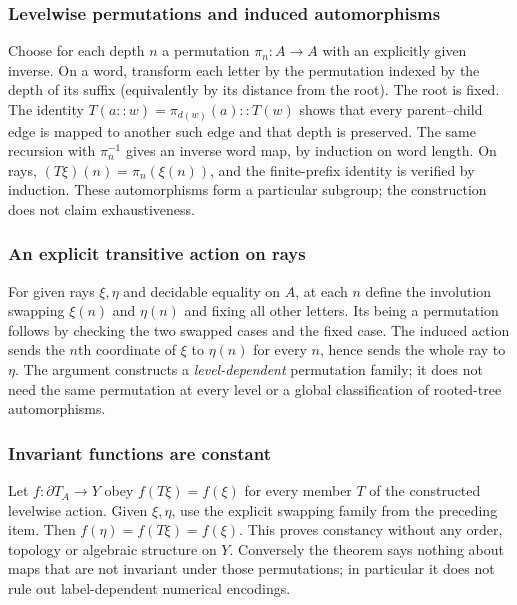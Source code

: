 \documentclass[11pt,reqno]{amsart}
\theoremstyle{definition}\newtheorem{definition}[theorem]{Definition}
\theoremstyle{remark}\newtheorem{remark}[theorem]{Remark}
\newcommand{\rays}{\partial T}
\begin{document}
\medskip
\subsubsection*{Levelwise permutations and induced automorphisms}\label{supp:11-1}
Choose for each depth $n$ a permutation $\pi_n:A\to A$ with an explicitly given inverse. On a word, transform each letter by the permutation indexed by the depth of its suffix (equivalently by its distance from the root). The root is fixed. The identity $T(a::w)=\pi_{d(w)}(a)::T(w)$ shows that every parent--child edge is mapped to another such edge and that depth is preserved. The same recursion with $\pi_n^{-1}$ gives an inverse word map, by induction on word length. On rays, $(T\xi)(n)=\pi_n(\xi(n))$, and the finite-prefix identity is verified by induction. These automorphisms form a particular subgroup; the construction does not claim exhaustiveness.
\medskip
\medskip
\subsubsection*{An explicit transitive action on rays}\label{supp:11-2}
For given rays $\xi,\eta$ and decidable equality on $A$, at each $n$ define the involution swapping $\xi(n)$ and $\eta(n)$ and fixing all other letters. Its being a permutation follows by checking the two swapped cases and the fixed case. The induced action sends the $n$th coordinate of $\xi$ to $\eta(n)$ for every $n$, hence sends the whole ray to $\eta$. The argument constructs a \emph{level-dependent} permutation family; it does not need the same permutation at every level or a global classification of rooted-tree automorphisms.
\medskip
\medskip
\subsubsection*{Invariant functions are constant}\label{supp:11-3}
Let $f:\rays_A\to Y$ obey $f(T\xi)=f(\xi)$ for every member $T$ of the constructed levelwise action. Given $\xi,\eta$, use the explicit swapping family from the preceding item. Then $f(\eta)=f(T\xi)=f(\xi)$. This proves constancy without any order, topology or algebraic structure on $Y$. Conversely the theorem says nothing about maps that are not invariant under those permutations; in particular it does not rule out label-dependent numerical encodings.
\medskip
\end{document}

